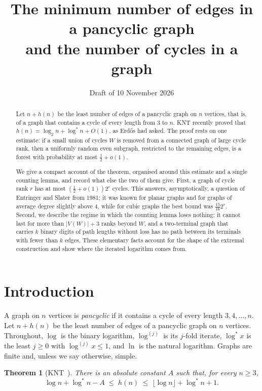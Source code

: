 \documentclass[11pt]{article}
\title{The minimum number of edges in a pancyclic graph\\ and the number of cycles in a graph}
\author{}
\date{Draft of 10 November 2026}
\newtheorem{theorem}{Theorem}[section]
\theoremstyle{definition}
\theoremstyle{remark}
\newcommand{\lgs}{\log^{*}}
\newcommand{\lgk}[1]{\log^{(#1)}}
\newcommand{\half}{\tfrac12}
\begin{document}
\maketitle

\begin{abstract}
Let $n+h(n)$ be the least number of edges of a pancyclic graph on $n$ vertices, that is, of a graph
that contains a cycle of every length from $3$ to $n$. KNT recently proved that
$h(n)=\log_2 n+\lgs n+O(1)$, as Erd\H{o}s had asked. The proof rests on one estimate: if a small union
of cycles $W$ is removed from a connected graph of large cycle rank, then a uniformly random even
subgraph, restricted to the remaining edges, is a forest with probability at most $\half+o(1)$.

We give a compact account of the theorem, organised around this estimate and a single counting lemma,
and record what else the two of them give. First, a graph of cycle rank $r$ has at most
$(\half+o(1))2^{r}$ cycles. This answers, asymptotically, a question of Entringer and Slater from 1981;
it was known for planar graphs and for graphs of average degree slightly above $4$, while for cubic
graphs the best bound was $\frac{15}{16}2^{r}$. Second, we describe the regime in which the counting
lemma loses nothing: it cannot last for more than $|V(W)|+3$ ranks beyond $W$, and a two-terminal graph
that carries $k$ binary digits of path lengths without loss has no path between its terminals with fewer
than $k$ edges. These elementary facts account for the shape of the extremal construction and show where the
iterated logarithm comes from.
\end{abstract}

\section{Introduction}\label{sec:intro}

A graph on $n$ vertices is \emph{pancyclic} if it contains a cycle of every length $3,4,\dots,n$.
Let $n+h(n)$ be the least number of edges of a pancyclic graph on $n$ vertices. Throughout, $\log$ is
the binary logarithm, $\lgk{j}$ is its $j$-fold iterate, $\lgs x$ is the least $j\ge0$ with
$\lgk{j}x\le1$, and $\ln$ is the natural logarithm. Graphs are finite and, unless we say otherwise,
simple.

\begin{theorem}[KNT~\cite{KNT}]\label{thm:main}
There is an absolute constant $A$ such that, for every $n\ge3$,
\[
  \log n+\lgs n-A\;\le\;h(n)\;\le\;\lfloor\log n\rfloor+\lgs n+1 .
\]
\end{theorem}
\end{document}
